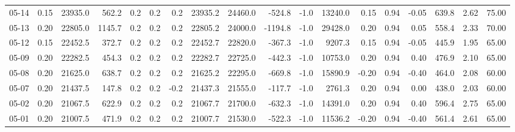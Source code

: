 \begin{threeparttable}
{\begin{tabular}{lrrrrrrrrrrrrrrrrr}
  05-14 &     0.15 & 23935.0 &             562.2 &               0.2 &                0.2 &                0.2 & 23935.2 & 24460.0 &     -524.8 &                     -1.0 &             13240.0 &       0.15 &      0.94 &          -0.05 &            639.8 &            2.62 &                  75.00 \\
  05-13 &     0.20 & 22805.0 &            1145.7 &               0.2 &                0.2 &                0.2 & 22805.2 & 24000.0 &    -1194.8 &                     -1.0 &             29428.0 &       0.20 &      0.94 &           0.05 &            558.4 &            2.33 &                  70.00 \\
  05-12 &     0.15 & 22452.5 &             372.7 &               0.2 &                0.2 &                0.2 & 22452.7 & 22820.0 &     -367.3 &                     -1.0 &              9207.3 &       0.15 &      0.94 &          -0.05 &            445.9 &            1.95 &                  65.00 \\
  05-09 &     0.20 & 22282.5 &             454.3 &               0.2 &                0.2 &                0.2 & 22282.7 & 22725.0 &     -442.3 &                     -1.0 &             10753.0 &       0.20 &      0.94 &           0.40 &            476.9 &            2.10 &                  65.00 \\
  05-08 &     0.20 & 21625.0 &             638.7 &               0.2 &                0.2 &                0.2 & 21625.2 & 22295.0 &     -669.8 &                     -1.0 &             15890.9 &      -0.20 &      0.94 &          -0.40 &            464.0 &            2.08 &                  60.00 \\
  05-07 &     0.20 & 21437.5 &             147.8 &               0.2 &                0.2 &               -0.2 & 21437.3 & 21555.0 &     -117.7 &                     -1.0 &              2761.3 &       0.20 &      0.94 &           0.00 &            438.0 &            2.03 &                  60.00 \\
  05-02 &     0.20 & 21067.5 &             622.9 &               0.2 &                0.2 &                0.2 & 21067.7 & 21700.0 &     -632.3 &                     -1.0 &             14391.0 &       0.20 &      0.94 &           0.40 &            596.4 &            2.75 &                  65.00 \\
  05-01 &     0.20 & 21007.5 &             471.9 &               0.2 &                0.2 &                0.2 & 21007.7 & 21530.0 &     -522.3 &                     -1.0 &             11536.2 &      -0.20 &      0.94 &          -0.40 &            561.4 &            2.61 &                  65.00 \\

\end{tabular}}
\end{threeparttable}
